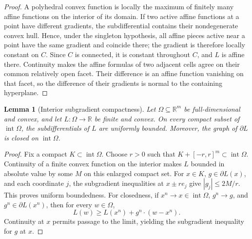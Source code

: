 \documentclass[11pt,a4paper,fleqn]{article}
\theoremstyle{plain}
\newtheorem{lemma}{Lemma}[section]
\theoremstyle{definition}
\newcommand{\R}{\mathbb{R}}
\begin{document}
\begin{proof}
A polyhedral convex function is locally the maximum of finitely many affine functions on the interior of its domain. If two active affine functions at a point have different gradients, the subdifferential contains their nondegenerate convex hull. Hence, under the singleton hypothesis, all affine pieces active near a point have the same gradient and coincide there; the gradient is therefore locally constant on $C$. Since $C$ is connected, it is constant throughout $C$, and $L$ is affine there. Continuity makes the affine formulas of two adjacent cells agree on their common relatively open facet. Their difference is an affine function vanishing on that facet, so the difference of their gradients is normal to the containing hyperplane.
\end{proof}

\begin{lemma}[Interior subgradient compactness]\label{lem:subgradient-compactness}
Let $\Omega\subseteq\R^m$ be full-dimensional and convex, and let $L:\Omega\to\R$ be finite and convex. On every compact subset of $\operatorname{int}\Omega$, the subdifferentials of $L$ are uniformly bounded. Moreover, the graph of $\partial L$ is closed on $\operatorname{int}\Omega$.
\end{lemma}

\begin{proof}
Fix a compact $K\subset\operatorname{int}\Omega$. Choose $r>0$ such that $K+[-r,r]^m\subset\operatorname{int}\Omega$. Continuity of a finite convex function on the interior makes $L$ bounded in absolute value by some $M$ on this enlarged compact set. For $x\in K$, $g\in\partial L(x)$, and each coordinate $j$, the subgradient inequalities at $x\pm re_j$ give $|g_j|\le 2M/r$. This proves uniform boundedness. For closedness, if $x^n\to x\in\operatorname{int}\Omega$, $g^n\to g$, and $g^n\in\partial L(x^n)$, then for every $w\in\Omega$,
\[
L(w)\ge L(x^n)+g^n\cdot(w-x^n).
\]
Continuity at $x$ permits passage to the limit, yielding the subgradient inequality for $g$ at $x$.
\end{proof}
\end{document}
